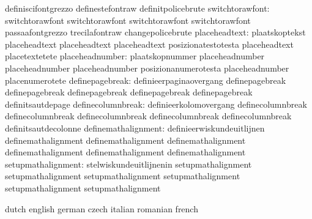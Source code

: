                                   definiscifontgrezzo              definestefontraw
                                  definitpolicebrute
                 switchtorawfont: switchtorawfont                  switchtorawfont
                                  switchtorawfont                  switchtorawfont
                                  passaafontgrezzo                 trecilafontraw
                                  changepolicebrute
                   placeheadtext: plaatskoptekst                   placeheadtext
                                  placeheadtext                    placeheadtext
                                  posizionatestotesta              placeheadtext
                                  placetextetete
                 placeheadnumber: plaatskopnummer                  placeheadnumber
                                  placeheadnumber                  placeheadnumber
                                  posizionanumerotesta             placeheadnumber
                                  placenumerotete
                 definepagebreak: definieerpaginaovergang          definepagebreak
                                  definepagebreak                  definepagebreak
                                  definepagebreak                  definepagebreak
                                  definitsautdepage
               definecolumnbreak: definieerkolomovergang           definecolumnbreak
                                  definecolumnbreak                definecolumnbreak
                                  definecolumnbreak                definecolumnbreak
                                  definitsautdecolonne
             definemathalignment: definieerwiskundeuitlijnen       definemathalignment
                                  definemathalignment              definemathalignment
                                  definemathalignment              definemathalignment
                                  definemathalignment
              setupmathalignment: stelwiskundeuitlijnenin          setupmathalignment
                                  setupmathalignment               setupmathalignment
                                  setupmathalignment               setupmathalignment
                                  setupmathalignment

\stopcommands



\startcommands                    dutch                            english
                                  german                           czech
                                  italian                          romanian
                                  french

